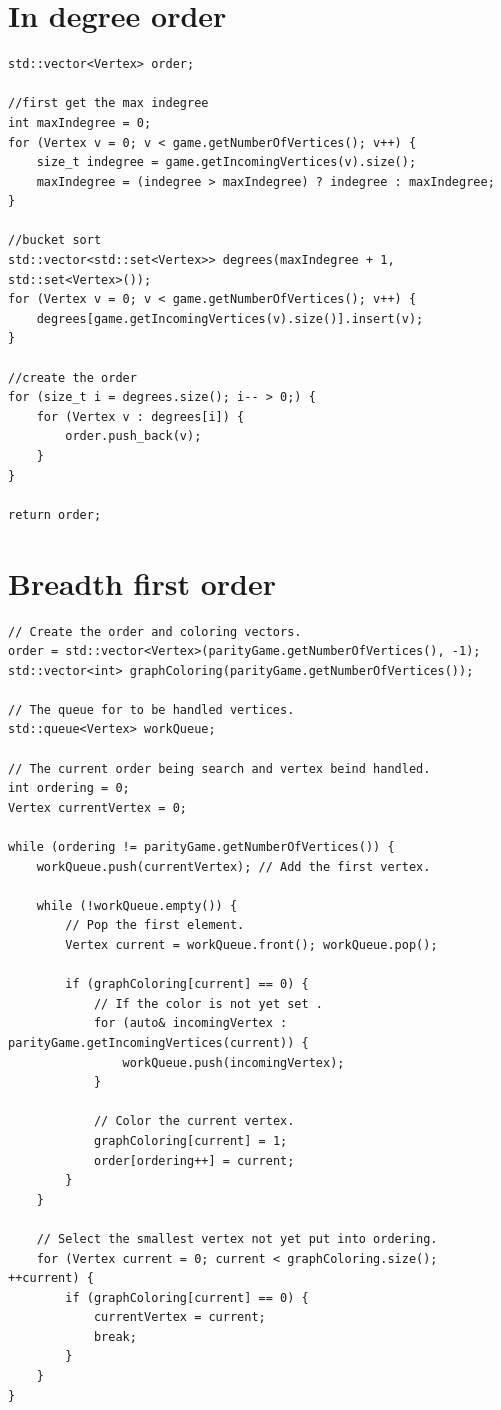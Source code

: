 \documentclass[10pt,a4paper]{article}
\begin{document}
\newpage
\appendix

\section{In degree order}\label{appendix:indegree}
\begin{verbatim}
std::vector<Vertex> order;

//first get the max indegree
int maxIndegree = 0;
for (Vertex v = 0; v < game.getNumberOfVertices(); v++) {
	size_t indegree = game.getIncomingVertices(v).size();
	maxIndegree = (indegree > maxIndegree) ? indegree : maxIndegree;
}

//bucket sort
std::vector<std::set<Vertex>> degrees(maxIndegree + 1, std::set<Vertex>());
for (Vertex v = 0; v < game.getNumberOfVertices(); v++) {
	degrees[game.getIncomingVertices(v).size()].insert(v);
}

//create the order
for (size_t i = degrees.size(); i-- > 0;) {
	for (Vertex v : degrees[i]) {
		order.push_back(v);
	}
}

return order;
\end{verbatim}

\newpage
\section{Breadth first order}\label{appendix:bfs}

\begin{verbatim}
// Create the order and coloring vectors.
order = std::vector<Vertex>(parityGame.getNumberOfVertices(), -1);
std::vector<int> graphColoring(parityGame.getNumberOfVertices());

// The queue for to be handled vertices.
std::queue<Vertex> workQueue;

// The current order being search and vertex beind handled.
int ordering = 0;
Vertex currentVertex = 0;

while (ordering != parityGame.getNumberOfVertices()) {
	workQueue.push(currentVertex); // Add the first vertex.

    while (!workQueue.empty()) {
    	// Pop the first element.
        Vertex current = workQueue.front(); workQueue.pop();

        if (graphColoring[current] == 0) {
        	// If the color is not yet set .
            for (auto& incomingVertex : parityGame.getIncomingVertices(current)) {
            	workQueue.push(incomingVertex);
            }

            // Color the current vertex.
            graphColoring[current] = 1;
            order[ordering++] = current;
        }
    }

    // Select the smallest vertex not yet put into ordering.
    for (Vertex current = 0; current < graphColoring.size(); ++current) {
    	if (graphColoring[current] == 0) {
        	currentVertex = current;
            break;
        }
    }
}
\end{verbatim}
\end{document}
